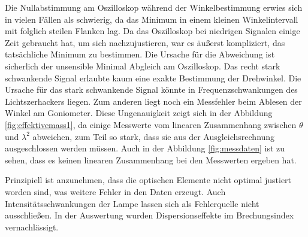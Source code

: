 Die Nullabstimmung am Oszilloskop während der Winkelbestimmung erwies sich in vielen Fällen als schwierig, da das Minimum in einem kleinen Winkelintervall mit folglich steilen Flanken lag.
Da das Oszilloskop bei niedrigen Signalen einige Zeit gebraucht hat, um sich nachzujustieren, war es äußerst kompliziert, das tatsächliche Minimum zu bestimmen. Die Ursache für die Abweichung ist sicherlich der unsensible Minimal Abgleich am Oszilloskop. Das recht stark schwankende Signal erlaubte kaum eine exakte Bestimmung der Drehwinkel. Die Ursache für das stark schwankende Signal könnte in Frequenzschwankungen des Lichtszerhackers liegen. Zum anderen liegt noch ein Messfehler beim Ablesen der Winkel am Goniometer.
Diese Ungenauigkeit zeigt sich in der Abbildung \ref{fig:effektivemass1}, da einige Messwerte vom linearen Zusammenhang zwischen $\theta$ und $\lambda^2$ abweichen, zum Teil so stark, dass sie aus der Ausgleichsrechnung ausgeschlossen werden müssen. Auch in der Abbildung \ref{fig:messdaten} ist zu sehen, dass es keinen linearen Zusammenhang bei den Messwerten ergeben hat. 


Prinzipiell ist anzunehmen, dass die optischen Elemente nicht optimal justiert worden sind, was weitere Fehler in den Daten erzeugt.
Auch Intensitätsschwankungen der Lampe lassen sich als Fehlerquelle nicht ausschließen. In der Auswertung wurden Dispersionseffekte im Brechungsindex vernachlässigt.
